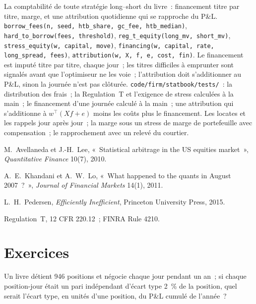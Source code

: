\begin{build}
 La comptabilité de toute stratégie long--short du livre~: financement titre par titre, marge, et une attribution quotidienne qui se rapproche du P\&L.
 \texttt{borrow\_fees(n, seed, htb\_share, gc\_fee, htb\_median)}, \texttt{hard\_to\_borrow(fees, threshold)},
\texttt{reg\_t\_equity(long\_mv, short\_mv)}, \texttt{stress\_equity(w, capital, move)}, \texttt{financing(w, capital, rate, long\_spread, fees)}, \texttt{attribution(w, X, f, e, cost, fin)}.
 Le financement est imputé titre par titre, chaque jour~; les titres difficiles à emprunter sont signalés avant que l'optimiseur ne les voie~; l'attribution doit
s'additionner au P\&L, sinon la journée n'est pas clôturée.
 \texttt{code/firm/statbook/tests/}~: la distribution des frais~; la Regulation~T et l'exigence de stress calculées à la main~; le financement d'une journée calculé à la main~; une
attribution qui s'additionne à $w^\top(Xf + e)$ moins les coûts plus le financement.
 Les locates et les rappels jour après jour~; la marge sous un stress de marge de portefeuille avec compensation~; le rapprochement avec un relevé du courtier.
\end{build}

\begin{omsources}
\item M.~Avellaneda et J.-H.~Lee, «~Statistical arbitrage in the US equities market~», \emph{Quantitative Finance} 10(7), 2010.
\item A.~E.~Khandani et A.~W.~Lo, «~What happened to the quants in August 2007~?~», \emph{Journal of Financial Markets} 14(1), 2011.
\item L.~H.~Pedersen, \emph{Efficiently Inefficient}, Princeton University Press, 2015.
\item Regulation~T, 12 CFR 220.12~; FINRA Rule 4210.
\end{omsources}

\section{Exercices}

\begin{exercise}[$\star$]\label{exo:s1:anatomy-of-a-stat-arb-book:1}
Un livre détient 946 positions et négocie chaque jour pendant un an~; si chaque position-jour était un pari indépendant d'écart type 2~\% de la position, quel serait
l'écart type, en unités d'une position, du P\&L cumulé de l'année~?
\end{exercise}

